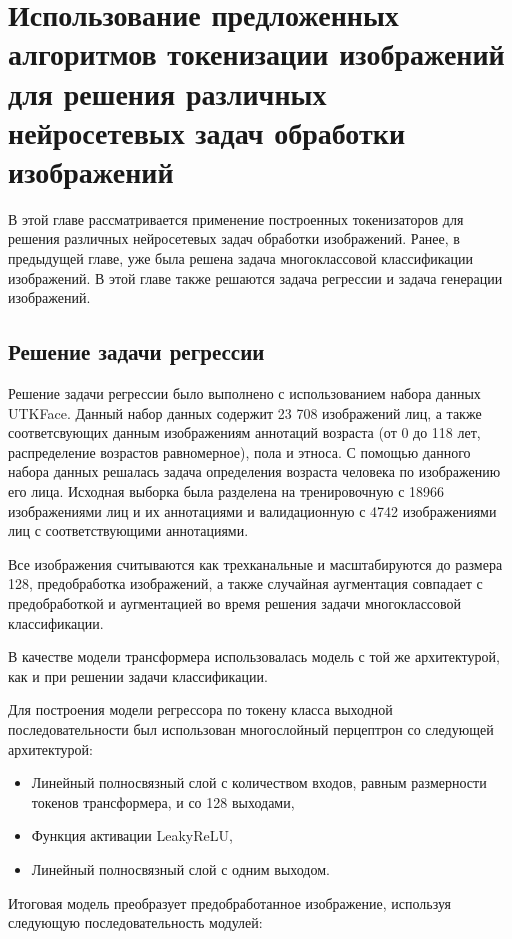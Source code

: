 \section{Использование предложенных алгоритмов токенизации изображений для решения различных нейросетевых задач обработки изображений}

В этой главе рассматривается применение построенных токенизаторов для решения различных нейросетевых задач обработки изображений. Ранее, в предыдущей главе, уже была решена задача многоклассовой классификации изображений. В этой главе также решаются задача регрессии и задача генерации изображений.

\subsection{Решение задачи регрессии}

Решение задачи регрессии было выполнено с использованием набора данных UTKFace. Данный набор данных содержит 23 708 изображений лиц, а также соответсвующих данным изображениям аннотаций возраста (от 0 до 118 лет, распределение возрастов равномерное), пола и этноса. С помощью данного набора данных решалась задача определения возраста человека по изображению его лица. Исходная выборка была разделена на тренировочную с 18966 изображениями лиц и их аннотациями и валидационную с 4742 изображениями лиц с соответствующими аннотациями.

Все изображения считываются как трехканальные и масштабируются до размера 128, предобработка изображений, а также случайная аугментация совпадает с предобработкой и аугментацией во время решения задачи многоклассовой классификации.

В качестве модели трансформера использовалась модель с той же архитектурой, как и при решении задачи классификации. 

Для построения модели регрессора по токену класса выходной последовательности был использован многослойный перцептрон со следующей архитектурой:

\begin{itemize}
    \item Линейный полносвязный слой с количеством входов, равным размерности токенов трансформера, и со 128 выходами,
    \item Функция активации LeakyReLU,
    \item Линейный полносвязный слой с одним выходом.
\end{itemize}

Итоговая модель преобразует предобработанное изображение, используя следующую последовательность модулей:

